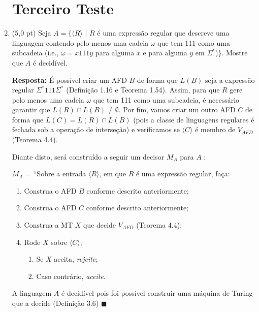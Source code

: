\documentclass[12pt,a4paper,oneside]{article}
\begin{document}
\begin{enumerate}
	
	\section*{Terceiro Teste}
	
	\item (5,0 pt)  Seja $A = \{\langle R \rangle$ | $R$ é uma expressão regular que descreve uma linguagem contendo pelo menos uma cadeia $\omega$ que tem 111 como uma subcadeia (i.e., $\omega = x111y$ para alguma $x$ e para alguma $y$ em $\Sigma^*$)$\}$. Mostre que $A$ é decidível.
	
	\vspace{0.3cm}
	
	{\color{blue} {\bf Resposta:} É possível criar um AFD $B$ de forma que $L(B)$ seja a expressão regular $\Sigma^*111\Sigma^*$ (Definição 1.16 e Teorema 1.54). Assim, para que $R$ gere pelo menos uma cadeia $\omega$ que tem 111 como uma subcadeia, é necessário garantir que $L(R) \cap L(B) \not= \emptyset$. Por fim, vamos criar um outro AFD $C$ de forma que $L(C) = L(R) \cap L(B)$ (pois a classe de linguagens regulares é fechada sob a operação de interseção) e verificamos se $\langle C \rangle$ é membro de $V_{AFD}$ (Teorema 4.4).
		
		Diante disto, será construído a seguir um decisor $M_A$ para $A$ :
		
		$M_A$ = ``Sobre a entrada $\langle R \rangle$, em que $R$ é uma expressão regular, faça:
		\begin{enumerate}
			\item Construa o AFD $B$ conforme descrito anteriormente;
			\item Construa o AFD $C$ conforme descrito anteriormente;
			\item Construa a MT $X$ que decide $V_{AFD}$ (Teorema 4.4);
			\item Rode $X$ sobre $\langle C \rangle$;
			\begin{enumerate}
				\item Se $X$ aceita, {\it rejeite};
				\item Caso contrário, {\it aceite}.
			\end{enumerate}					
		\end{enumerate}
		
		A linguagem $A$ é decidível pois foi possível construir uma máquina de Turing que a decide (Definição 3.6) $\blacksquare$
		
	}
	

\end{enumerate}
\end{document}

